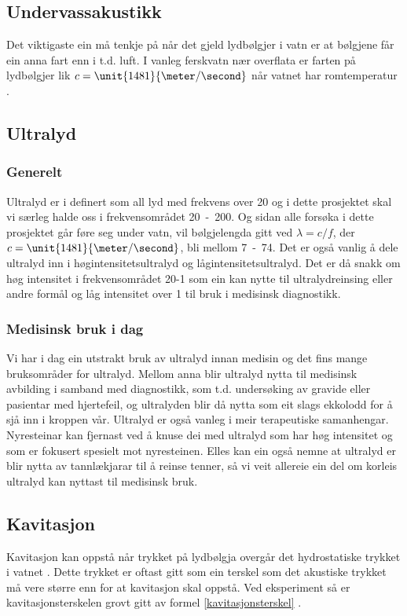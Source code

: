 \subsection{Undervassakustikk}
Det viktigaste ein må tenkje på når det gjeld lydbølgjer i vatn er at bølgjene får ein anna fart enn i t.d. luft. I vanleg ferskvatn nær overflata er farten på lydbølgjer lik $c = \unit{1481}{\meter / \second}$ når vatnet har romtemperatur \cite[s. 630]{citeulike:4412590}.
\subsection{Ultralyd}
\subsubsection*{Generelt}
Ultralyd er i \cite[s. 443]{citeulike:4412590} definert som all lyd med frekvens over \unit{20}{\kilo \hertz} og i dette prosjektet skal vi særleg halde oss i frekvensområdet \unit{20 - 200}{\kilo \hertz}. Og sidan alle forsøka i dette prosjektet går føre seg under vatn, vil bølgjelengda gitt ved $\lambda = c / f$, der $c = \unit{1481}{\meter / \second}$, bli mellom \unit{7 - 74}{\milli\meter}. Det er også vanlig å dele ultralyd inn i høgintensitetsultralyd og lågintensitetsultralyd. Det er då snakk om høg intensitet i frekvensområdet \unit{20}{\kilo\hertz}-\unit{1}{\mega\hertz} som ein kan nytte til ultralydreinsing eller andre formål og låg intensitet over \unit{1}{\mega\hertz} til bruk i medisinsk diagnostikk.

\subsubsection*{Medisinsk bruk i dag}
Vi har i dag ein utstrakt bruk av ultralyd innan medisin og det fins mange bruksområder for ultralyd. Mellom anna blir ultralyd nytta til medisinsk avbilding i samband med diagnostikk, som t.d. undersøking av gravide eller pasientar med hjertefeil, og ultralyden blir då nytta som eit slags ekkolodd for å sjå inn i kroppen vår. Ultralyd er også vanleg i meir terapeutiske samanhengar. Nyresteinar kan fjernast ved å knuse dei med ultralyd som har høg intensitet og som er fokusert spesielt mot nyresteinen. Elles kan ein også nemne at ultralyd er blir nytta av tannlækjarar til å reinse tenner, så vi veit allereie ein del om korleis ultralyd kan nyttast til medisinsk bruk.

\subsection{Kavitasjon}
\label{kavitasjonsteori}
Kavitasjon kan oppstå når trykket på lydbølgja overgår det hydrostatiske trykket i vatnet \cite{Kinsler:2000rc}. Dette trykket er oftast gitt som ein terskel som det akustiske trykket må vere større enn for at kavitasjon skal oppstå. Ved eksperiment så er kavitasjonsterskelen grovt gitt av formel \eqref{kavitasjonsterskel} \cite{kavitasjon}.

